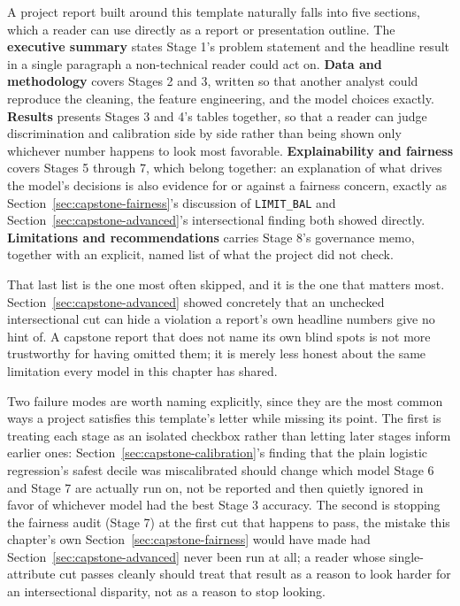 \documentclass[../ai_in_finance]{subfiles}
\begin{document}
A project report built around this template naturally falls into five sections, which a reader can use directly as a report or presentation outline. The \textbf{executive summary} states Stage 1's problem statement and the headline result in a single paragraph a non-technical reader could act on. \textbf{Data and methodology} covers Stages 2 and 3, written so that another analyst could reproduce the cleaning, the feature engineering, and the model choices exactly. \textbf{Results} presents Stages 3 and 4's tables together, so that a reader can judge discrimination and calibration side by side rather than being shown only whichever number happens to look most favorable. \textbf{Explainability and fairness} covers Stages 5 through 7, which belong together: an explanation of what drives the model's decisions is also evidence for or against a fairness concern, exactly as Section~\ref{sec:capstone-fairness}'s discussion of \texttt{LIMIT\_BAL} and Section~\ref{sec:capstone-advanced}'s intersectional finding both showed directly. \textbf{Limitations and recommendations} carries Stage 8's governance memo, together with an explicit, named list of what the project did not check.

That last list is the one most often skipped, and it is the one that matters most. Section~\ref{sec:capstone-advanced} showed concretely that an unchecked intersectional cut can hide a violation a report's own headline numbers give no hint of. A capstone report that does not name its own blind spots is not more trustworthy for having omitted them; it is merely less honest about the same limitation every model in this chapter has shared.

Two failure modes are worth naming explicitly, since they are the most common ways a project satisfies this template's letter while missing its point. The first is treating each stage as an isolated checkbox rather than letting later stages inform earlier ones: Section~\ref{sec:capstone-calibration}'s finding that the plain logistic regression's safest decile was miscalibrated should change which model Stage 6 and Stage 7 are actually run on, not be reported and then quietly ignored in favor of whichever model had the best Stage 3 accuracy. The second is stopping the fairness audit (Stage 7) at the first cut that happens to pass, the mistake this chapter's own Section~\ref{sec:capstone-fairness} would have made had Section~\ref{sec:capstone-advanced} never been run at all; a reader whose single-attribute cut passes cleanly should treat that result as a reason to look harder for an intersectional disparity, not as a reason to stop looking.
\end{document}
